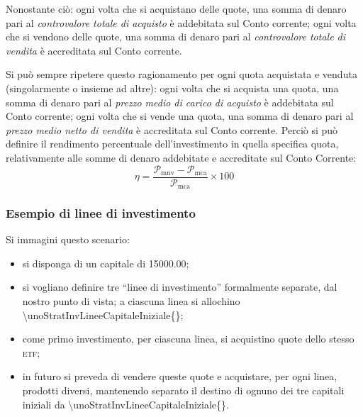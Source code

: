 \documentclass[12pt,a4paper]{article}
\newcommand{\Eur}[1]{\SI{#1}{\text{\euro{}}}}
\newcommand{\CalcoloRendimentoPercentualeSim}[2]{\frac{#1 - #2}{#2} \times{} \num{100}}
\newcommand{\Parentesi}[1]{(#1)}
\newcommand{\Virgolette}[1]{``#1''}
\newcommand{\Etf}[1]{\textsc{etf}}
\newcommand{\Pmc}[1]{\mathcal{P}_{\mathrm{mc}#1}}
\newcommand{\Pmca}[1]{\Pmc{\mathrm{a}#1}}
\newcommand{\Pmnv}[1]{\mathcal{P}_{\mathrm{mnv}#1}}
\begin{document}
Nonostante  ciò:  ogni  volta  che  si  acquistano   delle  quote,  una  somma  di  denaro  pari  al
\emph{controvalore totale di  acquisto} è addebitata sul  Conto corrente; ogni volta  che si vendono
delle quote,  una somma di denaro  pari al \emph{controvalore  totale di vendita} è  accreditata sul
Conto corrente.

Si   può   sempre   ripetere   questo   ragionamento   per   ogni   quota   acquistata   e   venduta
\Parentesi{singolarmente o  insieme ad altre}: ogni  volta che si  acquista una quota, una  somma di
denaro pari al \emph{prezzo medio di carico di acquisto} è addebitata sul Conto corrente; ogni volta
che  si vende  una  quota, una  somma di  denaro  pari al  \emph{prezzo  medio netto  di vendita}  è
accreditata sul Conto corrente.  Perciò si  può definire il rendimento percentuale dell'investimento
in quella  specifica quota, relativamente  alle somme di denaro  addebitate e accreditate  sul Conto
Corrente:
\begin{equation*}
  \eta = \CalcoloRendimentoPercentualeSim{\Pmnv{}}{\Pmca{}}
\end{equation*}

\subsubsection{Esempio di linee di investimento}


Si immagini questo scenario:
\begin{itemize}
\item si disponga di un capitale di \Eur{15000,00};
\item si vogliano  definire tre \Virgolette{linee di investimento} formalmente  separate, dal nostro
  punto di vista; a ciascuna linea si allochino \Eur{\unoStratInvLineeCapitaleIniziale{}};
\item come primo investimento, per ciascuna linea, si acquistino quote dello stesso \Etf{};
\item in futuro si  preveda di vendere queste quote e acquistare, per  ogni linea, prodotti diversi,
  mantenendo    separato    il    destino    di    ognuno   dei    tre    capitali    iniziali    da
  \Eur{\unoStratInvLineeCapitaleIniziale{}}.
\end{itemize}
\end{document}
